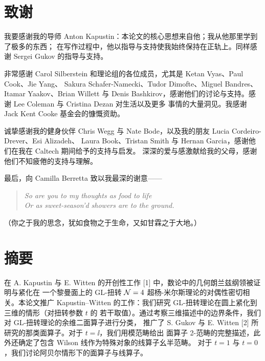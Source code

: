 
\chapter*{致谢}


我要感谢我的导师 Anton Kapustin：本论文的核心思想来自他；我从他那里学到了极多的东西；
在写作过程中，他以指导与支持使我始终保持在正轨上。同样感谢 Sergei Gukov 的指导与支持。

非常感谢 Carol Silberstein 和理论组的各位成员，尤其是 Ketan Vyas、Paul Cook、Jie Yang、
Sakura Schafer-Namecki、Tudor Dimofte、Miguel Bandres、Itamar Yaakov、Brian Willett 与
Denis Bashkirov，感谢他们的讨论与支持。感谢 Lee Coleman 与 Cristina Dezan 对生活以及更多
事情的大量洞见。我感谢 Jack Kent Cooke 基金会的慷慨资助。

诚挚感谢我的健身伙伴 Chris Wegg 与 Nate Bode，以及我的朋友 Lucia Cordeiro-Drever、Esi Alizadeh、
Laura Book、Tristan Smith 与 Hernan Garcia，感谢他们在我在 Caltech 期间给予的支持与启发。
深深的爱与感激献给我的父母，感谢他们不知疲倦的支持与理解。

最后，向 Camilla Berretta 致以我最深的谢意——
\begin{quote}
\itshape
So are you to my thoughts as food to life\\
Or as sweet-season'd showers are to the ground.
\end{quote}
（你之于我的思念，犹如食物之于生命，又如甘霖之于大地。）

\chapter*{摘要}


在 A. Kapustin 与 E. Witten 的开创性工作 [1] 中，数论中的几何朗兰兹纲领被证明与紧化在
一个黎曼面上的 GL-扭转 $\mathcal{N}=4$ 超杨-米尔斯理论的对偶性密切相关。本论文推广
Kapustin--Witten 的工作：我们研究 GL-扭转理论在圆上紧化到三维的情形（对扭转参数 $t$ 的
若干取值）。通过考察三维描述中的边界条件，我们对 GL-扭转理论的余维二面算子进行分类，
推广了 S. Gukov 与 E. Witten [2] 所研究的那类面算子。对于 $t=\ii$，我们用模范畴给出
面算子 2-范畴的完整描述，此外还确定了包含 Wilson 线作为特殊对象的线算子幺半范畴。
对于 $t=1$ 与 $t=0$，我们讨论阿贝尔情形下的面算子与线算子。

